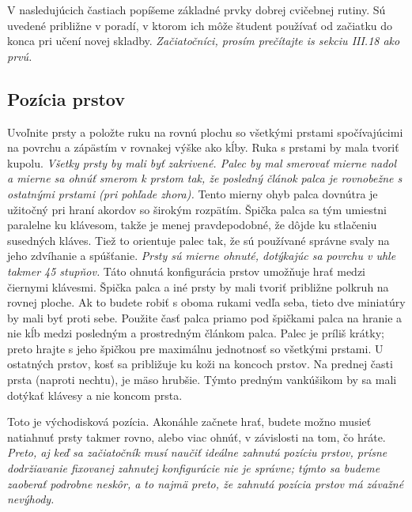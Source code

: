 V nasledujúcich častiach popíšeme základné prvky dobrej cvičebnej rutiny. Sú uvedené približne v poradí, v ktorom ich môže študent používať od začiatku do konca pri učení novej skladby. \emph{Začiatočníci, prosím prečítajte is sekciu III.18 ako prvú.}

\subsection{Pozícia prstov}
Uvoľnite prsty a položte ruku na rovnú plochu so všetkými prstami spočívajúcimi na povrchu a zápästím  v rovnakej výške ako kĺby. Ruka s prstami by mala tvoriť kupolu. \emph{Všetky prsty by mali byť zakrivené. Palec by mal smerovať mierne nadol a mierne sa ohnúť smerom k prstom tak, že posledný článok palca je rovnobežne s ostatnými prstami (pri pohľade zhora).} Tento mierny ohyb palca dovnútra je užitočný pri hraní akordov so širokým rozpätím. Špička palca sa tým umiestni paralelne ku klávesom, takže je menej pravdepodobné, že dôjde ku stlačeniu susedných kláves. Tiež to orientuje palec tak, že sú používané správne svaly na jeho zdvíhanie a spúšťanie. \emph{Prsty sú mierne ohnuté, dotýkajúc sa povrchu v uhle takmer 45 stupňov.} Táto ohnutá konfigurácia prstov umožňuje hrať medzi čiernymi klávesmi. Špička palca a iné prsty by mali tvoriť približne polkruh na rovnej ploche. Ak to budete robiť s oboma rukami vedľa seba, tieto dve miniatúry by mali byť proti sebe. Použite časť palca priamo pod špičkami palca na hranie a nie kĺb medzi posledným a prostredným článkom palca. Palec je príliš krátky;    preto hrajte s jeho špičkou pre maximálnu jednotnosť so všetkými prstami. U ostatných prstov, kosť sa približuje ku koži na koncoch prstov. Na prednej časti prsta (naproti nechtu), je mäso hrubšie. Týmto predným vankúšikom by sa mali dotýkať klávesy a nie koncom prsta.

Toto je východisková pozícia. Akonáhle začnete hrať, budete možno musieť natiahnuť prsty takmer rovno, alebo viac ohnúť, v závislosti na tom, čo hráte. \emph{Preto, aj keď sa začiatočník musí naučiť ideálne zahnutú pozíciu prstov, prísne dodržiavanie fixovanej zahnutej  konfigurácie nie je správne; týmto sa budeme zaoberať podrobne neskôr, a to najmä preto, že zahnutá pozícia prstov má závažné nevýhody.}


